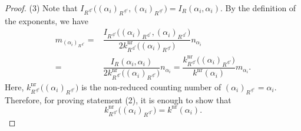 \documentclass[11pt]{amsart}
\newcommand{\nr}{\mathrm{nr}}
\newcommand{\dc}{\,\underline{\mathrm{d}}^c}
\newcommand{\nw}{\mathrm{nw}}
\begin{document}
{\begin{proof}
\vskip 1mm
\noindent
(3) Note that $I_{R^{\dc}}\big((\alpha_i)_{R^{\dc}},(\alpha_i)_{R^{\dc}}\big)
=I_R(\alpha_i,\alpha_i)$. By the definition of the exponents, we have
\begin{align*}
m_{(\alpha_i)_{R^{\dc}}}
=
&\dfrac{I_{R^{\dc}}\big((\alpha_i)_{R^{\dc}},(\alpha_i)_{R^{\dc}}\big)}
{2 k_{R^{\dc}}^\nr \big((\alpha_i)_{R^{\dc}}\big)}n_{\alpha_i} \\
=
&\dfrac{I_R(\alpha_i,\alpha_i)}{2 k_{R^{\dc}}^\nr \big((\alpha_i)_{R^{\dc}}\big)}
n_{\alpha_i}
=\dfrac{k_{R^{\dc}}^\nr \big((\alpha_i)_{R^{\dc}}\big)}{k^\nr(\alpha_i)}
m_{\alpha_i}.
\end{align*}
Here, $k_{R^{\dc}}^\nr \big((\alpha_i)_{R^{\dc}}\big)$ is the non-reduced counting number
of $(\alpha_i)_{R^{\dc}}=\alpha_i$. 
Therefore, for proving statement (2), it is enough to show that
\begin{equation}\label{nr-counting-number}
k_{R^{\dc}}^\nr \big((\alpha_i)_{R^{\dc}}\big)=k^\nr(\alpha_i).
\end{equation}


\end{proof}}
\end{document}
